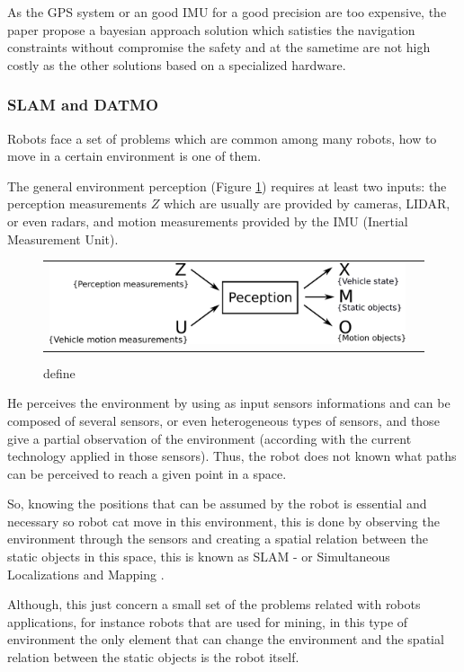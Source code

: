 As the GPS system or an good IMU for a good precision are too expensive, the paper propose a bayesian approach solution which satisties the navigation constraints without compromise the safety and at the sametime are not high costly as the other solutions based on a specialized hardware.

\subsubsection{SLAM and DATMO}

Robots face a set of problems which are common among many robots, how to move in a certain environment is one of them.

The general environment perception (Figure \ref{fig:perception:cycle}) requires at least two inputs: the perception measurements $Z$ which are usually are provided by cameras, LIDAR, or even radars, and motion measurements provided by the IMU (Inertial Measurement Unit).

\begin{figure}[H]
   \centering
     \begin{tabular}{lr}
       \includegraphics[scale=0.5]{img/fig:perception:cycle}
     \end{tabular}
   \caption{define}
   \label{fig:perception:cycle}
 \end{figure}


He perceives the environment by using as input sensors informations and can be composed of several sensors, or even heterogeneous types of sensors, and those give a partial observation of the environment (according with the current technology applied in those sensors). Thus, the robot does not known what paths can be perceived to reach a given point in a space.

So, knowing the positions that can be assumed by the robot is essential and necessary so robot cat move in this environment, this is done by observing the environment through the sensors and creating a spatial relation between the static objects in this space, this is known as SLAM - or Simultaneous Localizations and Mapping \cite{iyengar1991autonomous}.

Although, this just concern a small set of the problems related with robots applications, for instance robots that are used for mining, in this type of environment the only element that can change the environment and the spatial relation between the static objects is the robot itself. 

